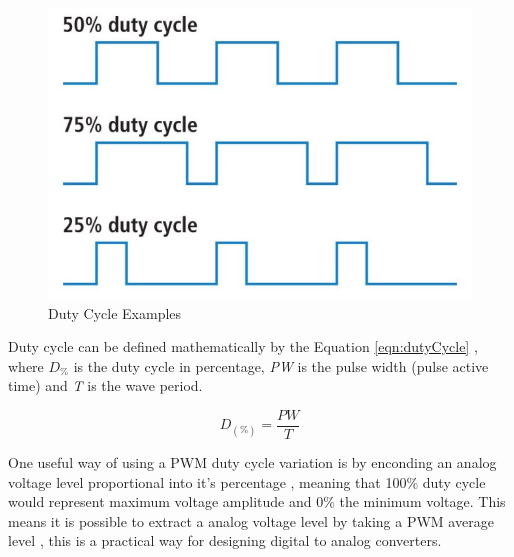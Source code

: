 	\begin{figure}[htbp]
		\centering
			\includegraphics[width=.45\textwidth]{figuras/fig-dutyCycle}
		\caption{Duty Cycle Examples \cite{fig-dutyCycle}}
		\label{fig:dutyCycle}
	\end{figure}

	Duty cycle can be defined mathematically by the Equation \ref{eqn:dutyCycle} \cite{james2001fundamentals}, where \textit{$D_{\%}$} is the duty cycle in percentage, \textit{PW} is the pulse width (pulse active time) and \textit{T} is the wave period. 

	\begin{equation}\label{eqn:dutyCycle}
		D_{ \left( \% \right) } =\frac{PW}{T}
	\end{equation}

	One useful way of using a PWM duty cycle variation is by enconding an analog voltage level proportional into it's percentage \cite{holmes2003pulse}, meaning that 100$\%$ duty cycle would represent maximum voltage amplitude and 0$\%$ the minimum voltage. This means it is possible to extract a analog voltage level by taking a PWM average level \cite{alter2008pwm}, this is a practical way for designing digital to analog converters.

